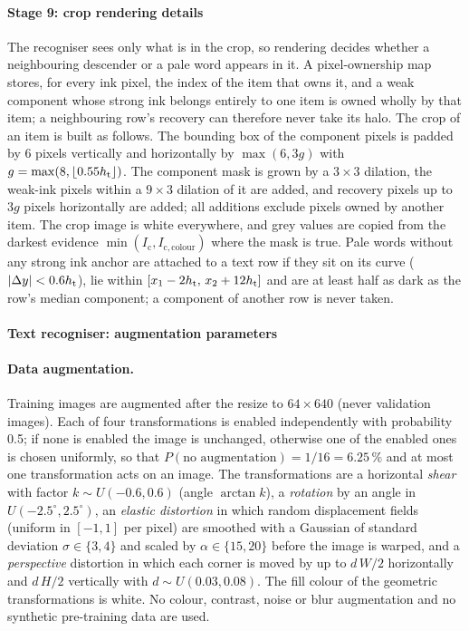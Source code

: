 \paragraph{Stage 9: crop rendering details}
The recogniser sees only what is in the crop, so rendering decides whether a neighbouring descender or a pale word appears in it.
A pixel-ownership map stores, for every ink pixel, the index of the item that owns it, and a weak component whose strong ink belongs entirely to one item is owned wholly by that item; a neighbouring row's recovery can therefore never take its halo.
The crop of an item is built as follows.
The bounding box of the component pixels is padded by 6 pixels vertically and horizontally by $\max(6,3g)$ with $g=\max(8,\lfloor0.55h_{\mathrm{t}}\rfloor)$.
The component mask is grown by a $3\times3$ dilation, the weak-ink pixels within a $9\times3$ dilation of it are added, and recovery pixels up to $3g$ pixels horizontally are added; all additions exclude pixels owned by another item.
The crop image is white everywhere, and grey values are copied from the darkest evidence $\min(I_{\mathrm c},I_{\mathrm{c,colour}})$ where the mask is true.
Pale words without any strong ink anchor are attached to a text row if they sit on its curve ($|\Delta y|<0.6h_{\mathrm{t}}$), lie within $[x_1-2h_{\mathrm{t}},\,x_2+12h_{\mathrm{t}}]$ and are at least half as dark as the row's median component; a component of another row is never taken.


\paragraph{Text recogniser: augmentation parameters}
\paragraph{Data augmentation.}
Training images are augmented after the resize to $64\times640$ (never validation images).
Each of four transformations is enabled independently with probability 0.5; if none is enabled the image is unchanged, otherwise one of the enabled ones is chosen uniformly, so that $P(\text{no augmentation})=1/16=6.25\,\%$ and at most one transformation acts on an image.
The transformations are a horizontal \emph{shear} with factor $k\sim U(-0.6,0.6)$ (angle $\arctan k$), a \emph{rotation} by an angle in $U(-2.5^\circ,2.5^\circ)$, an \emph{elastic distortion} \cite{simard2003} in which random displacement fields (uniform in $[-1,1]$ per pixel) are smoothed with a Gaussian of standard deviation $\sigma\in\{3,4\}$ and scaled by $\alpha\in\{15,20\}$ before the image is warped, and a \emph{perspective} distortion in which each corner is moved by up to $d\,W/2$ horizontally and $d\,H/2$ vertically with $d\sim U(0.03,0.08)$.
The fill colour of the geometric transformations is white.
No colour, contrast, noise or blur augmentation and no synthetic pre-training data are used.


